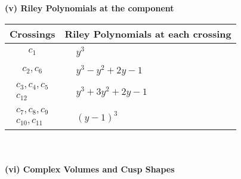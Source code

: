 \documentclass[1p]{elsarticle_modified}
\theoremstyle{definition}
\begin{document}
\newpage\renewcommand{\arraystretch}{1}
\flushleft \textbf{(v) Riley Polynomials at the component}\newline \\
\begin{tabular}{m{50pt}|m{274pt}}
Crossings & \hspace{64pt}Riley Polynomials at each crossing \\
\hline $$\begin{aligned}c_{1}\end{aligned}$$&$\begin{aligned}
&y^3
\end{aligned}$\\
\hline $$\begin{aligned}c_{2},c_{6}\end{aligned}$$&$\begin{aligned}
&y^3- y^2+2 y-1
\end{aligned}$\\
\hline $$\begin{aligned}c_{3},c_{4},c_{5}\\c_{12}\end{aligned}$$&$\begin{aligned}
&y^3+3 y^2+2 y-1
\end{aligned}$\\
\hline $$\begin{aligned}c_{7},c_{8},c_{9}\\c_{10},c_{11}\end{aligned}$$&$\begin{aligned}
&(y-1)^3
\end{aligned}$\\
\hline
\end{tabular}\\~\\
\newpage\flushleft \textbf{(vi) Complex Volumes and Cusp Shapes}
\end{document}
